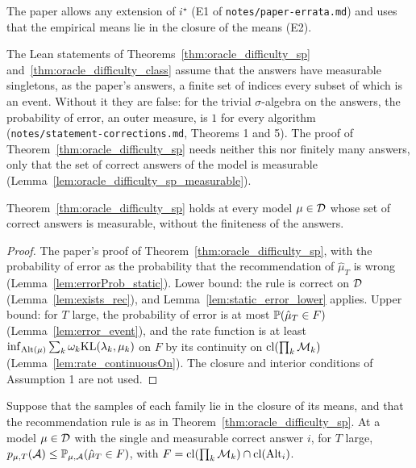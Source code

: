 The paper allows any extension of $i^{\star}$ (E1 of \texttt{notes/paper-errata.md}) and uses that
the empirical means lie in the closure of the means (E2).

The Lean statements of Theorems~\ref{thm:oracle_difficulty_sp} and~\ref{thm:oracle_difficulty_class}
assume that the answers have measurable singletons, as the paper's answers, a finite set of indices
every subset of which is an event. Without it they are false: for the trivial $\sigma$-algebra on
the answers, the probability of error, an outer measure, is $1$ for every algorithm
(\texttt{notes/statement-corrections.md}, Theorems 1 and 5). The proof of
Theorem~\ref{thm:oracle_difficulty_sp} needs neither this nor finitely many answers, only that the
set of correct answers of the model is measurable (Lemma~\ref{lem:oracle_difficulty_sp_measurable}).

\begin{lemma}[{\cite[Theorem 1]{D23}}]
  \label{lem:oracle_difficulty_sp_measurable}
  \leanok
  Theorem~\ref{thm:oracle_difficulty_sp} holds at every model $\mu \in \mathcal{D}$ whose set of correct
  answers is measurable, without the finiteness of the answers.
\end{lemma}

\begin{proof}
  \leanok
  The paper's proof of Theorem~\ref{thm:oracle_difficulty_sp}, with the probability of error as the
  probability that the recommendation of $\hat\mu_T$ is wrong (Lemma~\ref{lem:errorProb_static}).
  Lower bound: the rule is correct on $\mathcal{D}$ (Lemma~\ref{lem:exists_rec}), and
  Lemma~\ref{lem:static_error_lower} applies. Upper bound: for $T$
  large, the probability of error is at most $\mathbb{P}(\hat\mu_T \in F)$
  (Lemma~\ref{lem:error_event}), and the rate function is at least
  $\inf_{\mathrm{Alt}(\mu)} \sum_k \omega_k \mathrm{KL}(\lambda_k, \mu_k)$ on $F$ by its continuity on
  $\mathrm{cl}(\prod_k \mathcal{M}_k)$ (Lemma~\ref{lem:rate_continuousOn}). The closure and interior conditions of
  Assumption 1 are not used.
\end{proof}

\begin{lemma}
  \label{lem:error_event}
  \leanok
  Suppose that the samples of each family lie in the closure of its means, and that the
  recommendation rule is as in Theorem~\ref{thm:oracle_difficulty_sp}. At a model $\mu \in \mathcal{D}$
  with the single and measurable correct answer $i$, for $T$ large,
  $p_{\mu, T}(\mathcal{A}) \le \mathbb{P}_{\mu, \mathcal{A}}(\hat\mu_T \in F)$, with
  $F = \mathrm{cl}(\prod_k \mathcal{M}_k) \cap \mathrm{cl}(\mathrm{Alt}_i)$.
\end{lemma}

